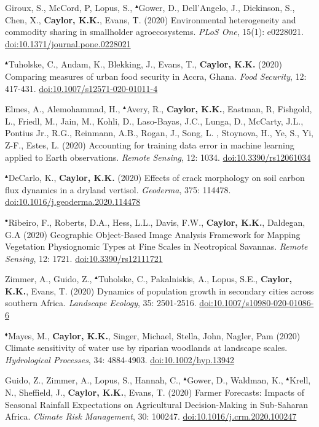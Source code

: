 \begin{etaremune}
\item Giroux, S., McCord, P, Lopus, S., $^{\blacktriangle}$Gower, D., Dell'Angelo, J., Dickinson, S., Chen, X., \textbf{ Caylor, K.K.}, Evans, T. (2020) Environmental heterogeneity and commodity sharing in smallholder agroecosystems. \emph{PLoS One}, 15(1): e0228021. \href{https://doi.org/10.1371/journal.pone.0228021}{doi:10.1371/journal.pone.0228021}
\item $^{\blacktriangle}$Tuholske, C., Andam, K., Blekking, J., Evans, T., \textbf{ Caylor, K.K.} (2020) Comparing measures of urban food security in Accra, Ghana. \emph{Food Security}, 12: 417-431. \href{https://doi.org/10.1007/s12571-020-01011-4}{doi:10.1007/s12571-020-01011-4}
\item Elmes, A., Alemohammad, H., $^{\blacktriangle}$Avery, R., \textbf{ Caylor, K.K.}, Eastman, R, Fishgold, L., Friedl, M., Jain, M., Kohli, D., Laso-Bayas, J.C., Lunga, D., McCarty, J.L., Pontius Jr., R.G., Reinmann, A.B., Rogan, J., Song, L. , Stoynova, H., Ye, S., Yi, Z-F., Estes, L. (2020) Accounting for training data error in machine learning applied to 
Earth observations. \emph{Remote Sensing}, 12: 1034. \href{https://doi.org/10.3390/rs12061034}{doi:10.3390/rs12061034}
\item $^{\blacktriangle}$DeCarlo, K., \textbf{ Caylor, K.K.} (2020) Effects of crack morphology on soil carbon flux dynamics in a dryland vertisol. \emph{Geoderma}, 375: 114478. \href{https://doi.org/10.1016/j.geoderma.2020.114478}{doi:10.1016/j.geoderma.2020.114478}
\item $^{\bullet}$Ribeiro, F., Roberts, D.A., Hess, L.L., Davis, F.W., \textbf{ Caylor, K.K.}, Daldegan, G.A (2020) Geographic Object-Based Image Analysis Framework for Mapping Vegetation Physiognomic Types at Fine Scales in Neotropical Savannas. \emph{Remote Sensing}, 12: 1721. \href{https://doi.org/10.3390/rs12111721}{doi:10.3390/rs12111721}
\item Zimmer, A., Guido, Z., $^{\blacktriangle}$Tuholske, C., Pakalniskis, A., Lopus, S.E., \textbf{ Caylor, K.K.}, Evans, T. (2020) Dynamics of population growth in secondary cities across southern Africa. \emph{Landscape Ecology}, 35: 2501-2516. \href{https://doi.org/10.1007/s10980-020-01086-6}{doi:10.1007/s10980-020-01086-6}
\item $^{\blacklozenge}$Mayes, M., \textbf{ Caylor, K.K.}, Singer, Michael, Stella, John, Nagler, Pam (2020) Climate sensitivity of water use by riparian woodlands at landscape scales. \emph{Hydrological Processes}, 34: 4884-4903. \href{https://doi.org/10.1002/hyp.13942}{doi:10.1002/hyp.13942}
\item Guido, Z., Zimmer, A., Lopus, S., Hannah, C., $^{\blacktriangle}$Gower, D., Waldman, K., $^{\blacktriangle}$Krell, N., Sheffield, J., \textbf{ Caylor, K.K.}, Evans, T. (2020) Farmer Forecasts: Impacts of Seasonal Rainfall Expectations on Agricultural Decision-Making in Sub-Saharan Africa. \emph{Climate Risk Management}, 30: 100247. \href{https://doi.org/10.1016/j.crm.2020.100247}{doi:10.1016/j.crm.2020.100247}


\end{etaremune}
